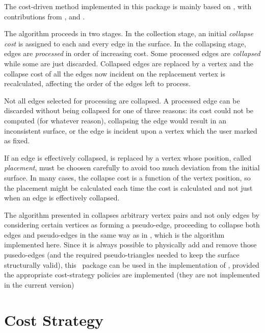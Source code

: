 The cost-driven method implemented in this package is mainly based on \cite[Memoryless simplification]{cgal:lt-fmeps-98,cgal:lt-ems-99}, with contributions from \cite[Mesh Optimization]{hddms-mo-93}, \cite[Surface simplification using quadric error metrics]{gh-ssqem-97}
and \cite[Topology preserving edge contraction]{degn-tpec-98}.

The algorithm proceeds in two stages. In the collection stage, an initial {\em collapse cost} is assigned to each and every edge in the surface. In the collapsing stage, edges are {\em processed} in order of increasing cost. Some processed edges are {\em collapsed} while some are just discarded. Collapsed edges are replaced by a vertex and the collapse cost of all the edges now incident on the replacement vertex is recalculated, affecting the order of the edges left to process.

Not all edges selected for processing are collapsed. A processed edge can be discarded without being collapsed for one of three reasons: its cost could not be computed (for whatever reason), collapsing the edge would result in an inconsistent surface, or the edge is incident upon a vertex which the user marked as fixed.

If an edge is effectively collapsed, is replaced by a vertex whose position, called {\em placement}, must be choosen carefully to avoid too much deviation from the initial surface. In many cases, the collapse cost is a function of the vertex position, so the placement might be calculated each time the cost is calculated and not just when an edge is effectively collapsed.

The algorithm presented in \cite{gh-ssqem-97} collapses arbitrary vertex pairs and not only edges by considering certain vertices as forming a pseudo-edge, proceeding to collapse both edges and pseudo-edges in the same way as in \cite{cgal:lt-fmeps-98,cgal:lt-ems-99}, which is the algorithm implemented here. Since it is always possible to physically add and remove those pusedo-edges (and the required pseudo-triangles needed to keep the surface structurally valid), this \cgal\ package can be used in the implementation of \cite{gh-ssqem-97}, provided the appropriate cost-strategy policies are implemented (they are not implemented in the current version)

\section{Cost Strategy}

